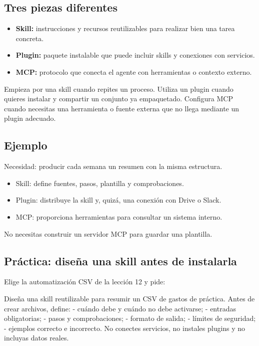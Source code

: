 \documentclass[10pt,a4paper,openany]{book}
\providecommand{\tightlist}{\setlength{\itemsep}{0.18em}\setlength{\parskip}{0pt}}
\newenvironment{Shaded}{}{}
\newcommand{\NormalTok}[1]{#1}
\renewenvironment{Shaded}
  {\begin{tcolorbox}[
    enhanced,
    breakable,
    colback=CodeBg,
    colframe=Border,
    boxrule=0.5pt,
    arc=2mm,
    left=3mm,
    right=3mm,
    top=2.2mm,
    bottom=2.2mm,
    before skip=0.8em,
    after skip=0.9em
  ]}
  {\end{tcolorbox}}
\begin{document}
\subsection{Tres piezas diferentes}\label{tres-piezas-diferentes}

\begin{itemize}
\tightlist
\item
  \textbf{Skill:} instrucciones y recursos reutilizables para realizar
  bien una tarea concreta.
\item
  \textbf{Plugin:} paquete instalable que puede incluir skills y
  conexiones con servicios.
\item
  \textbf{MCP:} protocolo que conecta el agente con herramientas o
  contexto externo.
\end{itemize}

Empieza por una skill cuando repites un proceso. Utiliza un plugin
cuando quieres instalar y compartir un conjunto ya empaquetado.
Configura MCP cuando necesitas una herramienta o fuente externa que no
llega mediante un plugin adecuado.

\subsection{Ejemplo}\label{ejemplo}

Necesidad: producir cada semana un resumen con la misma estructura.

\begin{itemize}
\tightlist
\item
  Skill: define fuentes, pasos, plantilla y comprobaciones.
\item
  Plugin: distribuye la skill y, quizá, una conexión con Drive o Slack.
\item
  MCP: proporciona herramientas para consultar un sistema interno.
\end{itemize}

No necesitas construir un servidor MCP para guardar una plantilla.

\subsection{Práctica: diseña una skill antes de
instalarla}\label{pruxe1ctica-diseuxf1a-una-skill-antes-de-instalarla}

Elige la automatización CSV de la lección 12 y pide:

\begin{Shaded}
\begin{Highlighting}[]
\NormalTok{Diseña una skill reutilizable para resumir un CSV de gastos de práctica.}
\NormalTok{Antes de crear archivos, define:}
\NormalTok{{-} cuándo debe y cuándo no debe activarse;}
\NormalTok{{-} entradas obligatorias;}
\NormalTok{{-} pasos y comprobaciones;}
\NormalTok{{-} formato de salida;}
\NormalTok{{-} límites de seguridad;}
\NormalTok{{-} ejemplos correcto e incorrecto.}
\NormalTok{No conectes servicios, no instales plugins y no incluyas datos reales.}
\end{Highlighting}
\end{Shaded}
\end{document}
